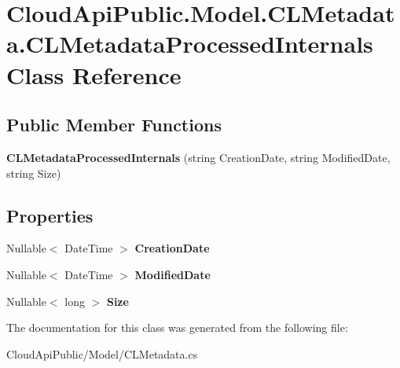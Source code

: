 \hypertarget{class_cloud_api_public_1_1_model_1_1_c_l_metadata_1_1_c_l_metadata_processed_internals}{\section{Cloud\-Api\-Public.\-Model.\-C\-L\-Metadata.\-C\-L\-Metadata\-Processed\-Internals Class Reference}
\label{class_cloud_api_public_1_1_model_1_1_c_l_metadata_1_1_c_l_metadata_processed_internals}
}
\subsection*{Public Member Functions}
\begin{DoxyCompactItemize}
\item 
\hypertarget{class_cloud_api_public_1_1_model_1_1_c_l_metadata_1_1_c_l_metadata_processed_internals_a6aa8077fdd880056d4acbfa942c218dd}{{\bfseries C\-L\-Metadata\-Processed\-Internals} (string Creation\-Date, string Modified\-Date, string Size)}\label{class_cloud_api_public_1_1_model_1_1_c_l_metadata_1_1_c_l_metadata_processed_internals_a6aa8077fdd880056d4acbfa942c218dd}

\end{DoxyCompactItemize}
\subsection*{Properties}
\begin{DoxyCompactItemize}
\item 
\hypertarget{class_cloud_api_public_1_1_model_1_1_c_l_metadata_1_1_c_l_metadata_processed_internals_ab24a9fc9cedcf39648ffaca92a40216c}{Nullable$<$ Date\-Time $>$ {\bfseries Creation\-Date}}\label{class_cloud_api_public_1_1_model_1_1_c_l_metadata_1_1_c_l_metadata_processed_internals_ab24a9fc9cedcf39648ffaca92a40216c}

\item 
\hypertarget{class_cloud_api_public_1_1_model_1_1_c_l_metadata_1_1_c_l_metadata_processed_internals_a13262ae6db4d2fc31ccfe2a3b4601e8a}{Nullable$<$ Date\-Time $>$ {\bfseries Modified\-Date}}\label{class_cloud_api_public_1_1_model_1_1_c_l_metadata_1_1_c_l_metadata_processed_internals_a13262ae6db4d2fc31ccfe2a3b4601e8a}

\item 
\hypertarget{class_cloud_api_public_1_1_model_1_1_c_l_metadata_1_1_c_l_metadata_processed_internals_ab8b4f620f34753faedfc62f168862826}{Nullable$<$ long $>$ {\bfseries Size}}\label{class_cloud_api_public_1_1_model_1_1_c_l_metadata_1_1_c_l_metadata_processed_internals_ab8b4f620f34753faedfc62f168862826}

\end{DoxyCompactItemize}


The documentation for this class was generated from the following file\-:\begin{DoxyCompactItemize}
\item 
Cloud\-Api\-Public/\-Model/C\-L\-Metadata.\-cs\end{DoxyCompactItemize}

